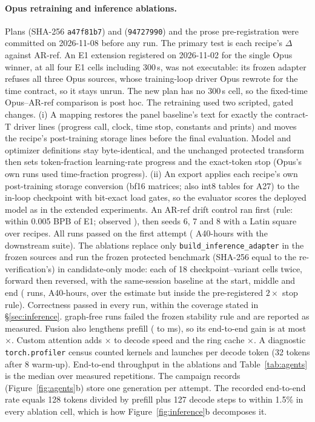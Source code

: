 \documentclass{article}
\begin{document}
\paragraph{Opus retraining and inference ablations.} Plans  (SHA-256 \texttt{a47f81b7}) and  (\texttt{94727990}) and the prose pre-registration  were committed on 2026-11-08 before any run. The primary test is each recipe's $\Delta$ against AR-ref. An E1 extension registered on 2026-11-02 for the single Opus winner, at all four E1 cells including 300\,s, was not executable: its frozen adapter refuses all three Opus sources, whose training-loop driver Opus rewrote for the time contract, so it stays unrun. The new plan has no 300\,s cell, so the fixed-time Opus--AR-ref comparison is post hoc. The retraining used two scripted, gated changes. (i) A mapping restores the panel baseline's text for exactly the contract-T driver lines (progress call, clock, time stop, constants and prints) and moves the recipe's post-training storage lines before the final evaluation. Model and optimizer definitions stay byte-identical, and the unchanged protected transform then sets token-fraction learning-rate progress and the exact-token stop (Opus's own runs used time-fraction progress). (ii) An export applies each recipe's own post-training storage conversion (bf16 matrices; also int8 tables for A27) to the in-loop checkpoint with bit-exact load gates, so the evaluator scores the deployed model as in the extended experiments. An AR-ref drift control ran first (rule: within 0.005 BPB of E1; observed \CRMTDriftAbs), then seeds 6, 7 and 8 with a Latin square over recipes. All \CRMTRuns{} runs passed on the first attempt (\CRMTHours{} A40-hours with the downstream suite). The ablations replace only \texttt{build\_inference\_adapter} in the frozen sources and run the frozen protected benchmark (SHA-256 equal to the re-verification's) in candidate-only mode: each of 18 checkpoint--variant cells twice, forward then reversed, with the same-session baseline at the start, middle and end (\CRIARuns{} runs, \CRIAHours{} A40-hours, over the estimate but inside the pre-registered $2\times$ stop rule). Correctness passed in every run, within the coverage stated in \S\ref{sec:inference}. \CRIAUnstable{} graph-free runs failed the frozen stability rule and are reported as measured. Fusion also lengthens prefill (\CRThreePreNoFusion{} to \CRThreePreOpus{} ms), so its end-to-end gain is at most \CRIAFusionEtoEHi$\times$. Custom attention adds \CRIAAttnLo$\times$ to decode speed and the ring cache \CRIARingLo$\times$. A diagnostic \texttt{torch.profiler} census counted kernels and launches per decode token (32 tokens after 8 warm-up). End-to-end throughput in the ablations and Table~\ref{tab:agents} is the median over measured repetitions. The campaign records (Figure~\ref{fig:agents}b) store one generation per attempt. The recorded end-to-end rate equals 128 tokens divided by prefill plus 127 decode steps to within 1.5\% in every ablation cell, which is how Figure~\ref{fig:inference}b decomposes it.
\end{document}

